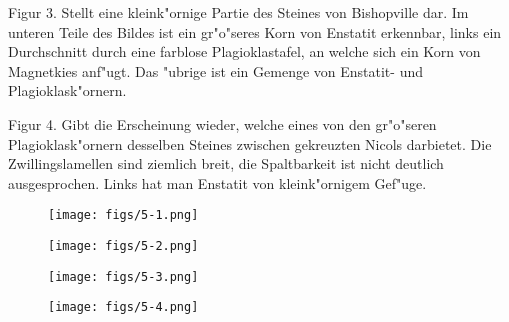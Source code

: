 \documentclass[a4paper, 11pt, oneside, polutonikogreek, german]{article}
\begin{document}
Figur 3. Stellt eine kleink"ornige Partie des Steines von Bishopville dar. Im unteren Teile des Bildes ist ein gr"o"seres Korn von Enstatit erkennbar, links ein Durchschnitt durch eine farblose Plagioklastafel, an welche sich ein Korn von Magnetkies anf"ugt. Das "ubrige ist ein Gemenge von Enstatit- und Plagioklask"ornern.

Figur 4. Gibt die Erscheinung wieder, welche eines von den gr"o"seren Plagioklask"ornern desselben Steines zwischen gekreuzten Nicols darbietet. Die Zwillingslamellen sind ziemlich breit, die Spaltbarkeit ist nicht deutlich ausgesprochen. Links hat man Enstatit von kleink"ornigem Gef"uge.
\clearpage

\vspace*{\fill}
\begin{figure}[H]
\centering
\texttt{[image: figs/5-1.png]}
\caption{}
\end{figure}
\vspace*{\fill}
\clearpage

\vspace*{\fill}
\begin{figure}[H]
\centering
\texttt{[image: figs/5-2.png]}
\caption{}
\end{figure}
\vspace*{\fill}
\clearpage

\vspace*{\fill}
\begin{figure}[H]
\centering
\texttt{[image: figs/5-3.png]}
\caption{}
\end{figure}
\vspace*{\fill}
\clearpage

\vspace*{\fill}
\begin{figure}[H]
\centering
\texttt{[image: figs/5-4.png]}
\caption{}
\end{figure}
\vspace*{\fill}
\clearpage
\end{document}

